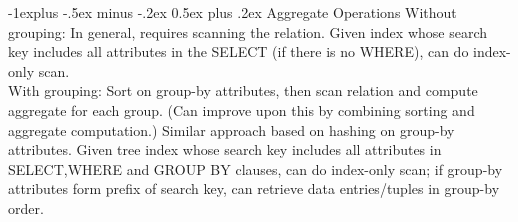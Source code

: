 \documentclass[10pt,landscape]{article}
\makeatletter
\renewcommand{\subsection}{\@startsection{subsection}{2}{0mm}%
                                {-1explus -.5ex minus -.2ex}%
                                {0.5ex plus .2ex}%
                                {\normalfont\normalsize\bfseries}}
\makeatother
\begin{document}
\begin{multicols}{3}
\subsection{Aggregate Operations}
Without grouping: In general, requires scanning the relation. Given index whose search key includes all attributes in the SELECT (if there is no WHERE), can do index-only scan.\\
With grouping: Sort on group-by attributes, then scan relation and compute aggregate for each group. (Can improve upon this by combining sorting and aggregate computation.) Similar approach based on hashing on group-by attributes. Given tree index whose search key includes all attributes in SELECT,WHERE and GROUP BY clauses, can do index-only scan; if group-by attributes form prefix of search key, can retrieve data entries/tuples in group-by order.


\end{multicols}
\end{document}
